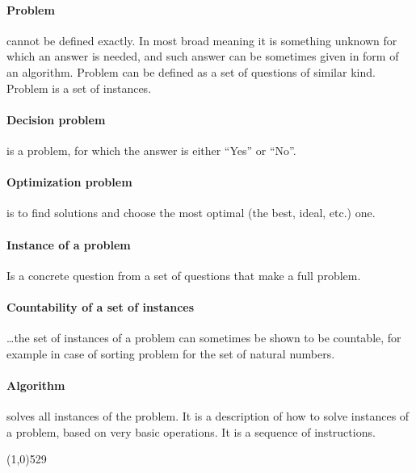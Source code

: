 \documentclass{article}
\newcommand{\separator}{\noindent \line(1,0){529}}
\begin{document}
\begin{multicols}{2}

\paragraph{Problem}
cannot be defined exactly. In most broad meaning it is something unknown for which an answer is
needed, and such answer can be sometimes given in form of an algorithm. Problem can be defined as a
set of questions of similar kind. Problem is a set of instances.

\paragraph{Decision problem} is a problem, for which the answer is either ``Yes'' or ``No''.

\paragraph{Optimization problem} is to find solutions and choose the most optimal (the best, ideal,
etc.) one.

\paragraph{Instance of a problem}
Is a concrete question from a set of questions that make a full problem.

\paragraph{Countability of a set of instances}
\ldots the set of instances of a problem can sometimes be shown to be countable, for example in case
of sorting problem for the set of natural numbers.

\paragraph{Algorithm}
solves all instances of the problem. It is a description of how to solve instances of a problem,
based on very basic operations. It is a sequence of instructions.

\end{multicols}

\separator

\end{document}
